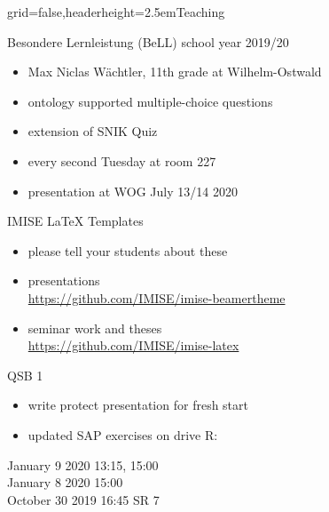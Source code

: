 \documentclass[]{kiesgrube}
\begin{document}
\begin{poster}%
{grid=false,headerheight=2.5em}{}{Teaching}{}

\begin{posterbox}[name=person,column=0,row=0]{Besondere Lernleistung (BeLL) school year 2019/20}
\begin{itemize}
\item Max Niclas Wächtler, 11th grade at Wilhelm-Ostwald 
\item ontology supported multiple-choice questions
\item extension of SNIK Quiz
\item every second Tuesday at room 227
\item presentation at WOG July 13/14 2020\\ 
\end{itemize}
\end{posterbox}
\begin{posterbox}[name=risks,column=1,row=0]{IMISE LaTeX Templates}
\begin{itemize}
\item please tell your students about these
\item presentations\\ \url{https://github.com/IMISE/imise-beamertheme}
\item seminar work and theses\\ \url{https://github.com/IMISE/imise-latex}
\end{itemize}
\end{posterbox}
\begin{posterbox}[name=event,below=person]{QSB 1}
\begin{itemize}
\item write protect presentation for fresh start 
\item updated SAP exercises on drive R: 
\end{itemize}
January 9 2020 13:15, 15:00\\
January 8 2020 15:00\\
October 30 2019 16:45 SR 7\\
\end{posterbox}


\end{poster}
\end{document}
